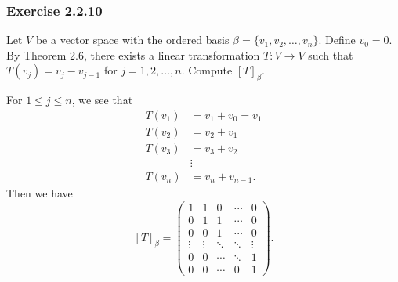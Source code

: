 \subsubsection{Exercise 2.2.10} Let \( V  \) be a vector space with the ordered basis \( \beta = \{ {v}_{1}, {v}_{2}, \dots, {v}_{n} \}.  \) Define \( {v}_{0} = 0  \). By Theorem 2.6, there exists a linear transformation \( T: V \to V  \) such that \( T({v}_{j}) = {v}_{j} - {v}_{j-1}  \) for \( j = 1, 2, \dots, n \). Compute \( [T]_{\beta}^{}  \).
\begin{solution}
For \( 1 \leq j \leq n  \), we see that 
\begin{align*}
    T({v}_{1}) &= {v}_{1} + {v}_{0} = {v}_{1}  \\
    T({v}_{2}) &= {v}_{2} + {v}_{1} \\ 
    T({v}_{3}) &= {v}_{3} + {v}_{2} \\
               &\vdots \\
    T({v}_{n}) &= {v}_{n} + {v}_{n-1}.
\end{align*}
Then we have
\[ {[T]}_{\beta} = \begin{pmatrix}
    1 & 1 & 0 & \cdots & 0 \\
    0 & 1 & 1 & \cdots & 0 \\
    0 & 0 & 1 & \cdots & 0 \\
    \vdots & \vdots & \ddots  & \ddots & \vdots \\
    0 & 0 &  \cdots & \ddots  &    1 \\
    0 & 0 & \cdots & 0 & 1 
\end{pmatrix}.  \]
\end{solution}


